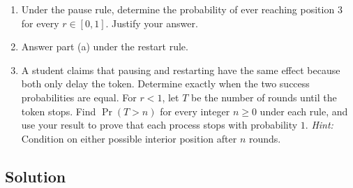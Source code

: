 \documentclass[11pt,a4paper]{article}
\begin{document}
\begin{enumerate}
    \item Under the pause rule, determine the probability
    of ever reaching position $3$ for every $r\in[0,1]$.
    Justify your answer.

    \item Answer part (a) under the restart rule.

    \item A student claims that pausing and restarting
    have the same effect because both only delay the token.
    Determine exactly when the two success probabilities are equal.
    For $r<1$, let $T$ be the number of rounds until the token stops.
    Find $\Pr(T>n)$ for every integer $n\geq0$ under each rule,
    and use your result to prove that each process stops
    with probability $1$.
    \emph{Hint:} Condition on either possible interior position
    after $n$ rounds.
\end{enumerate}

\subsection*{Solution}
\end{document}
